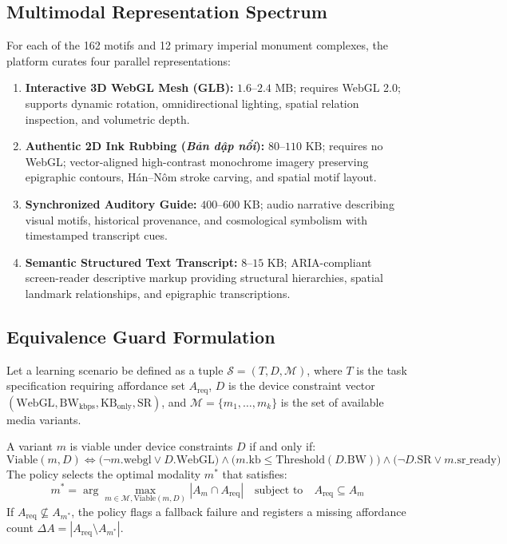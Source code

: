 \documentclass[11pt,a4paper]{article}
\begin{document}
\subsection{Multimodal Representation Spectrum}
For each of the 162 motifs and 12 primary imperial monument complexes, the platform curates four parallel representations:
\begin{enumerate}
    \item \textbf{Interactive 3D WebGL Mesh (GLB):} $1.6$--$2.4\text{ MB}$; requires WebGL 2.0; supports dynamic rotation, omnidirectional lighting, spatial relation inspection, and volumetric depth.
    \item \textbf{Authentic 2D Ink Rubbing (\textit{Bản dập nổi}):} $80$--$110\text{ KB}$; requires no WebGL; vector-aligned high-contrast monochrome imagery preserving epigraphic contours, Hán--Nôm stroke carving, and spatial motif layout.
    \item \textbf{Synchronized Auditory Guide:} $400$--$600\text{ KB}$; audio narrative describing visual motifs, historical provenance, and cosmological symbolism with timestamped transcript cues.
    \item \textbf{Semantic Structured Text Transcript:} $8$--$15\text{ KB}$; ARIA-compliant screen-reader descriptive markup providing structural hierarchies, spatial landmark relationships, and epigraphic transcriptions.
\end{enumerate}

\subsection{Equivalence Guard Formulation}
Let a learning scenario be defined as a tuple $\mathcal{S} = (T, D, \mathcal{M})$, where $T$ is the task specification requiring affordance set $A_{\text{req}}$, $D$ is the device constraint vector $(\text{WebGL}, \text{BW}_{\text{kbps}}, \text{KB}_{\text{only}}, \text{SR})$, and $\mathcal{M} = \{m_1, \dots, m_k\}$ is the set of available media variants.

A variant $m$ is viable under device constraints $D$ if and only if:
\begin{equation}
    \text{Viable}(m, D) \iff \big(\neg m.\text{webgl} \lor D.\text{WebGL}\big) \land \big(m.\text{kb} \le \text{Threshold}(D.\text{BW})\big) \land \big(\neg D.\text{SR} \lor m.\text{sr\_ready}\big)
\end{equation}
The policy selects the optimal modality $m^*$ that satisfies:
\begin{equation}
    m^* = \arg\max_{m \in \mathcal{M}, \text{Viable}(m, D)} \left| A_m \cap A_{\text{req}} \right| \quad \text{subject to} \quad A_{\text{req}} \subseteq A_m
\end{equation}
If $A_{\text{req}} \not\subseteq A_{m^*}$, the policy flags a fallback failure and registers a missing affordance count $\Delta A = |A_{\text{req}} \setminus A_{m^*}|$.
\end{document}

